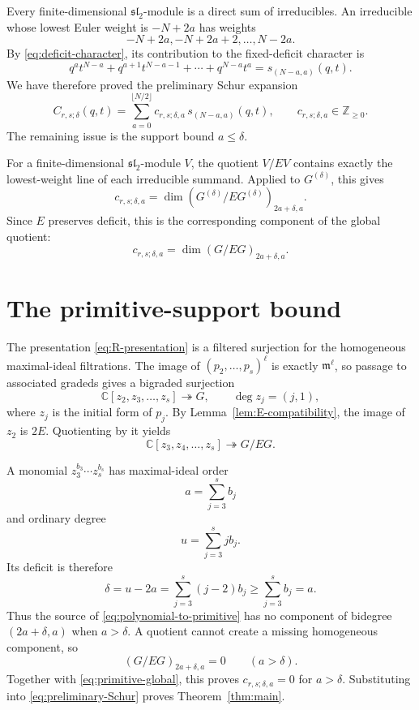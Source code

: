 \documentclass[11pt]{article}
\newcommand{\C}{\mathbb{C}}
\newcommand{\Z}{\mathbb{Z}}
\begin{document}
Every finite-dimensional $\mathfrak{sl}_2$-module is a direct sum of
irreducibles.  An irreducible whose lowest Euler weight is
$-N+2a$ has weights
\[
 -N+2a,-N+2a+2,\ldots,N-2a.
\]
By \eqref{eq:deficit-character}, its contribution to the fixed-deficit
character is
\[
 q^at^{N-a}+q^{a+1}t^{N-a-1}+\cdots+q^{N-a}t^a
 =s_{(N-a,a)}(q,t).
\]
We have therefore proved the preliminary Schur expansion
\begin{equation}\label{eq:preliminary-Schur}
 C_{r,s;\delta}(q,t)
 =\sum_{a=0}^{\lfloor N/2\rfloor}
 c_{r,s;\delta,a}\,s_{(N-a,a)}(q,t),
 \qquad c_{r,s;\delta,a}\in\Z_{\geq0}.
\end{equation}
The remaining issue is the support bound $a\leq\delta$.

For a finite-dimensional $\mathfrak{sl}_2$-module $V$, the quotient
$V/EV$ contains exactly the lowest-weight line of each irreducible
summand.  Applied to $G^{(\delta)}$, this gives
\begin{equation}\label{eq:primitive-G-delta}
 c_{r,s;\delta,a}
 =\dim\left(G^{(\delta)}/EG^{(\delta)}\right)_{2a+\delta,a}.
\end{equation}
Since $E$ preserves deficit, this is the corresponding component of
the global quotient:
\begin{equation}\label{eq:primitive-global}
 c_{r,s;\delta,a}
 =\dim(G/EG)_{2a+\delta,a}.
\end{equation}

\section{The primitive-support bound}\label{sec:support}

The presentation \eqref{eq:R-presentation} is a filtered surjection
for the homogeneous maximal-ideal filtrations.  The image of
$(p_2,\ldots,p_s)^\ell$ is exactly $\mathfrak m^\ell$, so passage to
associated gradeds gives a bigraded surjection
\begin{equation}\label{eq:polynomial-to-G}
 \C[z_2,z_3,\ldots,z_s]\twoheadrightarrow G,
 \qquad \deg z_j=(j,1),
\end{equation}
where $z_j$ is the initial form of $p_j$.  By
Lemma~\ref{lem:E-compatibility}, the image of $z_2$ is $2E$.
Quotienting by it yields
\begin{equation}\label{eq:polynomial-to-primitive}
 \C[z_3,z_4,\ldots,z_s]\twoheadrightarrow G/EG.
\end{equation}

A monomial $z_3^{b_3}\cdots z_s^{b_s}$ has maximal-ideal order
\[
 a=\sum_{j=3}^s b_j
\]
and ordinary degree
\[
 u=\sum_{j=3}^s j b_j.
\]
Its deficit is therefore
\begin{equation}\label{eq:monomial-deficit}
 \delta=u-2a
 =\sum_{j=3}^s(j-2)b_j
 \geq\sum_{j=3}^s b_j=a.
\end{equation}
Thus the source of \eqref{eq:polynomial-to-primitive} has no component
of bidegree $(2a+\delta,a)$ when $a>\delta$.  A quotient cannot create
a missing homogeneous component, so
\[
 (G/EG)_{2a+\delta,a}=0
 \qquad(a>\delta).
\]
Together with \eqref{eq:primitive-global}, this proves
$c_{r,s;\delta,a}=0$ for $a>\delta$.  Substituting into
\eqref{eq:preliminary-Schur} proves
Theorem~\ref{thm:main}.
\end{document}
